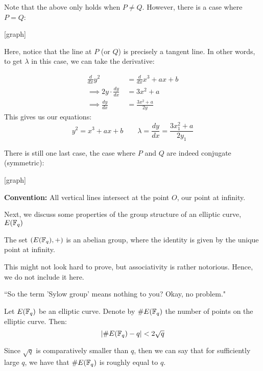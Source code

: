 \documentclass{article}
\begin{document}
Note that the above only holds when $ P \neq Q $.
However, there is a case where $ P = Q $:

[graph]

Here, notice that the line at $ P $ (or $ Q $) is precisely a tangent line.
In other words, to get $ \lambda $ in this case, we can take the derivative:

\begin{align*}
    \frac{d}{dx}y^{2} & \ = \frac{d}{dx}x^{3} + ax + b \\
    \implies 2y \cdot \frac{dy}{dx} & \ = 3x^{2} + a \\
    \implies \frac{dy}{dx} & \ = \frac{3x^{2} + a}{2y}
\end{align*}
This gives us our equations:
\begin{equation*}
    y^{2} = x^{3} + ax + b \qquad \lambda = \frac{dy}{dx} = \frac{3x_{1}^{2} + a}{2y_{1}}
\end{equation*}

There is still one last case, the case where $ P $ and $ Q $ are indeed conjugate (symmetric):

[graph]

\textbf{Convention:} All vertical lines intersect at the point $ O $, our point at infinity.

Next, we discuss some properties of the group structure of an elliptic curve, $ E(\mathbb{F}_{q}) $

\begin{thm}
    The set $ \left( E(\mathbb{F}_{q}), + \right) $ is an abelian group,
    where the identity is given by the unique point at infinity.
\end{thm}
This might not look hard to prove, but associativity is rather notorious.
Hence, we do not include it here.

``So the term 'Sylow group' means nothing to you? Okay, no problem."

\begin{thm}
    Let $ E(\mathbb{F}_{q}) $ be an elliptic curve.
    Denote by $ \#E(\mathbb{F}_{q}) $ the number of points on the elliptic curve. Then:
    \begin{equation*}
        \abs{\#E(\mathbb{F}_{q}) - q} < 2\sqrt{q}
    \end{equation*}
\end{thm}
Since $ \sqrt{q} $ is comparatively smaller than $ q $, then we can say that for sufficiently
large $ q $, we have that $ \#E(\mathbb{F}_{q}) $ is roughly equal to $ q $.
\end{document}

